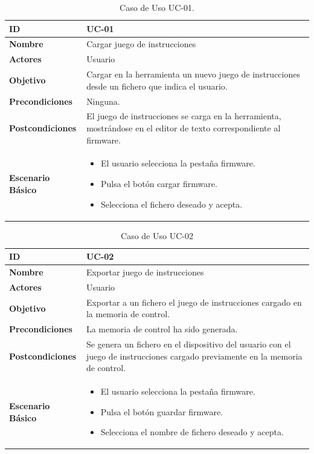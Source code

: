 \begin{center}
\begin{table}[htbp]
\centering
\begin{tabular}{@{}p{2.5cm} p{9cm}@{}} 
\toprule
\textbf{ID}	& UC-01  \\
\midrule
\textbf{Nombre} 		& Cargar juego de instrucciones   \\
\midrule
\textbf{Actores} 		&	Usuario  \\
\midrule
\textbf{Objetivo} 	&	Cargar en la herramienta un nuevo juego de instrucciones desde un fichero que indica el usuario. 	 \\
\midrule
\textbf{Precondiciones}	&	Ninguna.   \\
\midrule
\textbf{Postcondiciones} 	&	El juego de instrucciones se carga en la herramienta, mostrándose en el editor de texto correspondiente al firmware.   \\
\midrule
\textbf{Escenario Básico} 	&  \begin{itemize}
\item El usuario selecciona la pestaña firmware.
\item Pulsa el botón cargar firmware.
\item Selecciona el fichero deseado y acepta.
\end{itemize} \\
\bottomrule
\end{tabular}
\caption{Caso de Uso UC-01.}
\label{tab:uc01}
\end{table}
\end{center}


\begin{center}
\begin{table}[htbp]
\centering
\begin{tabular}{@{}p{2.5cm} p{9cm}@{}} 
\toprule
\textbf{ID}	& UC-02  \\
\midrule
\textbf{Nombre} 		& Exportar juego de instrucciones   \\
\midrule
\textbf{Actores} 		&	Usuario  \\
\midrule
\textbf{Objetivo} 	&	Exportar a un fichero el juego de instrucciones cargado en la memoria de control. 	 \\
\midrule
\textbf{Precondiciones}	&	La memoria de control ha sido generada.   \\
\midrule
\textbf{Postcondiciones} 	& Se genera un fichero en el dispositivo del usuario con el juego de instrucciones cargado previamente en la memoria de control.   \\
\midrule
\textbf{Escenario Básico} 	&  \begin{itemize}
\item El usuario selecciona la pestaña firmware.
\item Pulsa el botón guardar firmware.
\item Selecciona el nombre de fichero deseado y acepta.
\end{itemize} \\
\bottomrule
\end{tabular}
\caption{Caso de Uso UC-02}
\label{tab:uc02}
\end{table}
\end{center}

